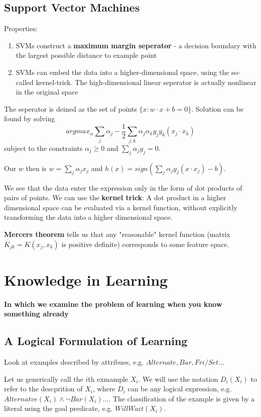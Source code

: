 \documentclass{scrartcl}
\begin{document}
\subsection{Support Vector Machines}
Properties:
\begin{enumerate}
    \item
        SVMs construct a \textbf{maximum margin seperator} - a decision boundary with the largest possible distance to example point
    \item
        SVMs can embed the data into a higher-dimensional space, using the so-called kernel-trick. The high-dimensional linear seperator is actually nonlinear in the original space
\end{enumerate}

The seperator is deined as the set of points \(\{x: w\cdot x + b = 0\}\). Solution can be found by solving
\[argmax_{\alpha} \sum_j \alpha_j - \frac{1}{2} \sum_{j,k} \alpha_j \alpha_k y_j y_k (x_j \cdot x_k)\]
subject to the constraints \(\alpha_j \geq 0\) and \(\sum_j \alpha_j y_j = 0\). 

Our \(w\) then is \(w = \sum_j \alpha_j x_j\) and
\(h(x) = sign(\sum_j \alpha_j y_j (x \cdot x_j) - b)\).

\bigbreak

We see that the data enter the expression only in the form of dot products of pairs of points. We can use the \textbf{kernel trick}: A dot product in a higher dimensional space can be evaluated via a kernel function, without explicitly transforming the data into a higher dimensional space.

\textbf{Mercers theorem} tells us that any "reasonable" kernel function (matrix \(K_{jk} = K(x_j ,x_k)\) is positive definite) corresponds to some feature space.

\section{Knowledge in Learning}
\textbf{In which we examine the problem of learning when you know something already}

\subsection{A Logical Formulation of Learning}
Look at examples described by attribues, e.g. \(Alternate, Bar, Fri/Set\)...

Let us generically call the \(i\)th exmample \(X_i\). We will use the notation \(D_i(X_i)\) to refer to the descprition of \(X_i\), where \(D_i\) can be any logical expression, e.g. \(Alternatve(X_i) \land \lnot Bar(X_i) \dots\). The classification of the example is given by a literal using the goal predicate, e.g. \(WillWait(X_i)\).
\end{document}
